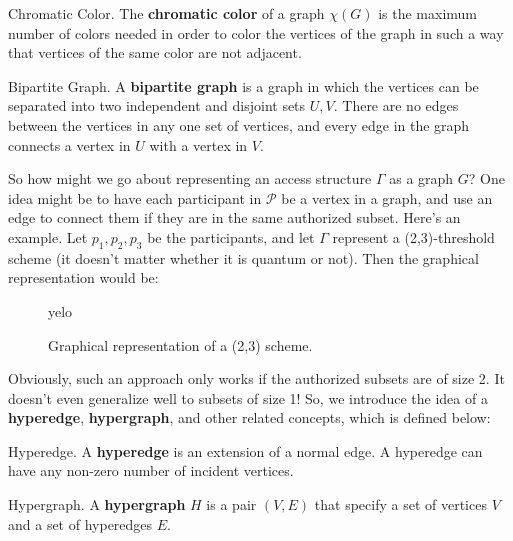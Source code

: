\begin{definition}{Chromatic Color.}
    \label{defn:colors}
	The \textbf{chromatic color} of a graph $\chi(G)$ is the maximum number of colors needed in order to color the vertices of the graph in such a way that vertices of the same color are not adjacent.
\end{definition}

\begin{definition}{Bipartite Graph.}
    \label{defn:bipartite}
	A \textbf{bipartite graph} is a graph in which the vertices can be separated into two independent and disjoint sets $U,V$. There are no edges between the vertices in any one set of vertices, and every edge in the graph connects a vertex in $U$ with a vertex in $V$.
\end{definition}

So how might we go about representing an access structure $\Gamma$ as a graph $G$? One idea might be to have each participant in $\mathcal{P}$ be a vertex in a graph, and use an edge to connect them if they are in the same authorized subset. Here's an example. Let $p_1,p_2,p_3$ be the participants, and let $\Gamma$ represent a (2,3)-threshold scheme (it doesn't matter whether it is quantum or not). Then the graphical representation would be:

\begin{figure}[ht]
    \centering
    yelo
    \caption{Graphical representation of a (2,3) scheme.}
    \label{fig:2-3-scheme}
\end{figure}


Obviously, such an approach only works if the authorized subsets are of size 2. It doesn't even generalize well to subsets of size 1! So, we introduce the idea of a \textbf{hyperedge}, \textbf{hypergraph}, and other related concepts, which is defined below: 

\begin{definition}{Hyperedge.}
    \label{defn:hyperedge}
    A \textbf{hyperedge} is an extension of a normal edge. A hyperedge can have any non-zero number of incident vertices.
\end{definition}

\begin{definition}{Hypergraph.}
    \label{defn:hypergraph}
    A \textbf{hypergraph} $H$ is a pair $(V,E)$ that specify a set of vertices $V$ and a set of hyperedges $E$.
\end{definition}


